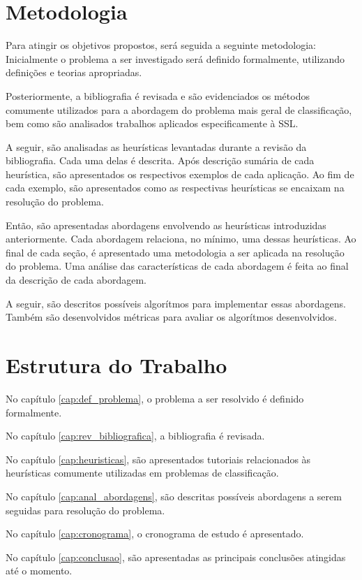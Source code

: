\section{Metodologia}

Para atingir os objetivos propostos, será seguida a seguinte metodologia:
Inicialmente o problema a ser investigado será definido formalmente,
utilizando definições e teorias apropriadas.

Posteriormente, a bibliografia é revisada e são evidenciados os métodos comumente
utilizados para a abordagem do problema mais geral de classificação, bem como são
analisados trabalhos aplicados especificamente à SSL.

A seguir, são analisadas as heurísticas levantadas durante a
revisão da bibliografia. Cada uma delas é descrita. Após descrição sumária
de cada heurística, são apresentados os respectivos exemplos de cada aplicação.
Ao fim de cada exemplo, são apresentados como as respectivas heurísticas se encaixam na
resolução do problema.

Então, são apresentadas abordagens envolvendo as heurísticas introduzidas
anteriormente. Cada abordagem relaciona, no mínimo, uma dessas heurísticas.
Ao final de cada seção, é apresentado uma metodologia a ser aplicada
na resolução do problema. Uma análise das características de cada abordagem
é feita ao final da descrição de cada abordagem.

A seguir, são descritos possíveis algorítmos para implementar essas abordagens. Também são
desenvolvidos métricas para avaliar os algorítmos desenvolvidos.


\section{Estrutura do Trabalho}

No capítulo \ref{cap:def_problema}, o problema a ser resolvido é definido formalmente.

No capítulo \ref{cap:rev_bibliografica}, a bibliografia é revisada.

No capítulo \ref{cap:heuristicas}, são apresentados tutoriais relacionados às
heurísticas comumente utilizadas em problemas de classificação.

No capítulo \ref{cap:anal_abordagens}, são descritas possíveis abordagens a serem
seguidas para resolução do problema.

No capítulo \ref{cap:cronograma}, o cronograma de estudo é apresentado.

No capítulo \ref{cap:conclusao}, são apresentadas as principais conclusões atingidas
até o momento.
